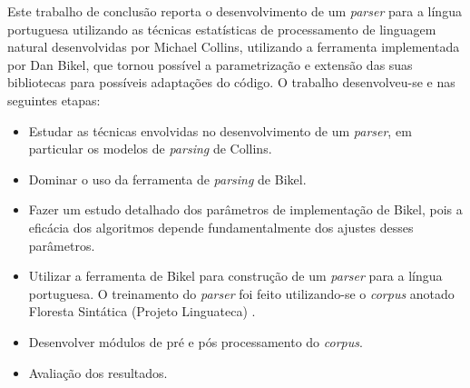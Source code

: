 Este trabalho de conclusão reporta o desenvolvimento de um \emph{parser} para a língua portuguesa utilizando as técnicas estatísticas de processamento de linguagem natural desenvolvidas por Michael Collins, utilizando a ferramenta implementada por Dan Bikel, que tornou possível a parametrização e extensão das suas bibliotecas para possíveis adaptações do código. O trabalho desenvolveu-se e nas seguintes etapas:

\begin{itemize}
	\item Estudar as técnicas envolvidas no desenvolvimento de um \emph{parser}, em particular os modelos de \emph{parsing} de Collins.
	\item Dominar o uso da ferramenta de \emph{parsing} de Bikel.
	\item Fazer um estudo detalhado dos parâmetros de implementação de Bikel, pois a eficácia dos algoritmos depende fundamentalmente dos ajustes desses parâmetros.
	\item Utilizar a ferramenta de Bikel para construção de um \emph{parser} para a língua portuguesa. O treinamento do \emph{parser} foi feito utilizando-se o \emph{corpus} anotado Floresta Sintática (Projeto Linguateca) \cite{florestasintatica}.
	\item Desenvolver módulos de pré e pós processamento do \emph{corpus}.
	\item Avaliação dos resultados.

\end{itemize}

